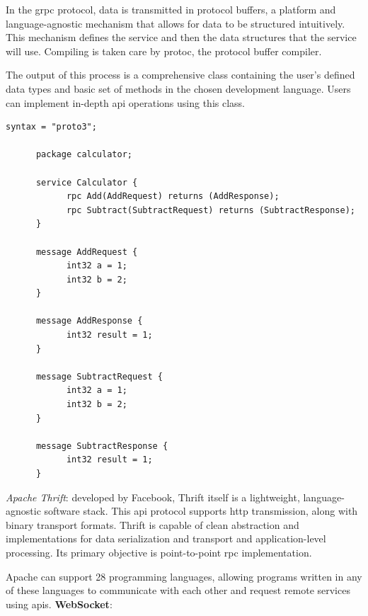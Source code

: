 \begin{multicols}{2}
\begin{multicols}{2}
            In the \acrshort{grpc} protocol, data is transmitted in protocol buffers, a platform and language-agnostic mechanism
            that allows for data to be structured intuitively. This mechanism defines the service and then the data structures
            that the service will use. Compiling is taken care by protoc, the protocol buffer compiler.

            The output of this process is a comprehensive class containing the user's defined data types and basic set of methods
            in the chosen development language. Users can implement in-depth \acrshort{api} operations using this class.
      \end{multicols}

      \begin{lstlisting}[caption=gRPC Service For a Calculator In a Protobuf File]
      syntax = "proto3";

      package calculator;

      service Calculator {
            rpc Add(AddRequest) returns (AddResponse);
            rpc Subtract(SubtractRequest) returns (SubtractResponse);
      }

      message AddRequest {
            int32 a = 1;
            int32 b = 2;
      }

      message AddResponse {
            int32 result = 1;
      }

      message SubtractRequest {
            int32 a = 1;
            int32 b = 2;
      }

      message SubtractResponse {
            int32 result = 1;
      }
\end{lstlisting}

      \begin{multicols}{2}
            \textit{Apache Thrift}: developed by Facebook, Thrift itself is a lightweight, language-agnostic software stack.
            This \acrshort{api} protocol supports \acrshort{http} transmission, along with binary transport formats. Thrift
            is capable of clean abstraction and implementations for data serialization and transport and application-level
            processing. Its primary objective is point-to-point \acrshort{rpc} implementation.

            Apache can support 28 programming languages, allowing programs written in any of these languages to communicate
            with each other and request remote services using \acrshort{api}s.
            \textbf{WebSocket}:
      \end{multicols}


\end{multicols}
